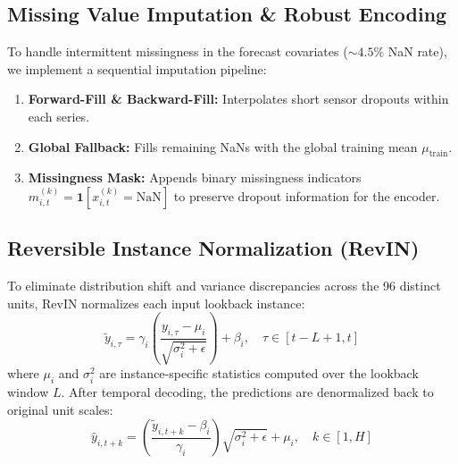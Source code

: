 \documentclass[11pt,a4paper]{article}
\begin{document}
\subsection{Missing Value Imputation \& Robust Encoding}
To handle intermittent missingness in the forecast covariates ($\sim 4.5\%$ NaN rate), we implement a sequential imputation pipeline:
\begin{enumerate}
    \item \textbf{Forward-Fill \& Backward-Fill:} Interpolates short sensor dropouts within each series.
    \item \textbf{Global Fallback:} Fills remaining NaNs with the global training mean $\mu_{\text{train}}$.
    \item \textbf{Missingness Mask:} Appends binary missingness indicators $m_{i, t}^{(k)} = \mathbf{1}[x_{i, t}^{(k)} = \text{NaN}]$ to preserve dropout information for the encoder.
\end{enumerate}

\subsection{Reversible Instance Normalization (RevIN)}
To eliminate distribution shift and variance discrepancies across the 96 distinct units, RevIN normalizes each input lookback instance:
\begin{equation}
    \tilde{y}_{i, \tau} = \gamma_i \left( \frac{y_{i, \tau} - \mu_i}{\sqrt{\sigma_i^2 + \epsilon}} \right) + \beta_i, \quad \tau \in [t-L+1, t]
\end{equation}
where $\mu_i$ and $\sigma_i^2$ are instance-specific statistics computed over the lookback window $L$. After temporal decoding, the predictions are denormalized back to original unit scales:
\begin{equation}
    \hat{y}_{i, t+k} = \left( \frac{\tilde{y}_{i, t+k} - \beta_i}{\gamma_i} \right) \sqrt{\sigma_i^2 + \epsilon} + \mu_i, \quad k \in [1, H]
\end{equation}
\end{document}
